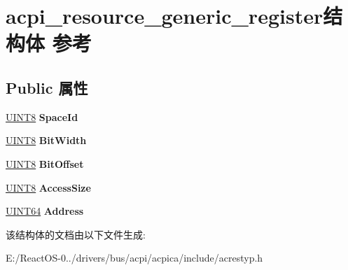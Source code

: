 \hypertarget{structacpi__resource__generic__register}{}\section{acpi\+\_\+resource\+\_\+generic\+\_\+register结构体 参考}
\label{structacpi__resource__generic__register}
\subsection*{Public 属性}
\begin{DoxyCompactItemize}
\item 
\mbox{\label{structacpi__resource__generic__register_a332ace155b9f0223451780d12a641457}} 
\hyperlink{_processor_bind_8h_ab27e9918b538ce9d8ca692479b375b6a}{U\+I\+N\+T8} {\bfseries Space\+Id}
\item 
\mbox{\label{structacpi__resource__generic__register_acad1b549316cc2e1c7c0b46eb0c0a072}} 
\hyperlink{_processor_bind_8h_ab27e9918b538ce9d8ca692479b375b6a}{U\+I\+N\+T8} {\bfseries Bit\+Width}
\item 
\mbox{\label{structacpi__resource__generic__register_a54af59ff62c3bcd1b02939f0a117c8e7}} 
\hyperlink{_processor_bind_8h_ab27e9918b538ce9d8ca692479b375b6a}{U\+I\+N\+T8} {\bfseries Bit\+Offset}
\item 
\mbox{\label{structacpi__resource__generic__register_a037d9eac9803ce213a6faa3f40707d76}} 
\hyperlink{_processor_bind_8h_ab27e9918b538ce9d8ca692479b375b6a}{U\+I\+N\+T8} {\bfseries Access\+Size}
\item 
\mbox{\label{structacpi__resource__generic__register_ac5a0fe6c1dec618e1b11f3b2bb3d523e}} 
\hyperlink{_processor_bind_8h_a57be03562867144161c1bfee95ca8f7c}{U\+I\+N\+T64} {\bfseries Address}
\end{DoxyCompactItemize}


该结构体的文档由以下文件生成\+:\begin{DoxyCompactItemize}
\item 
E\+:/\+React\+O\+S-\/0../drivers/bus/acpi/acpica/include/acrestyp.\+h\end{DoxyCompactItemize}
